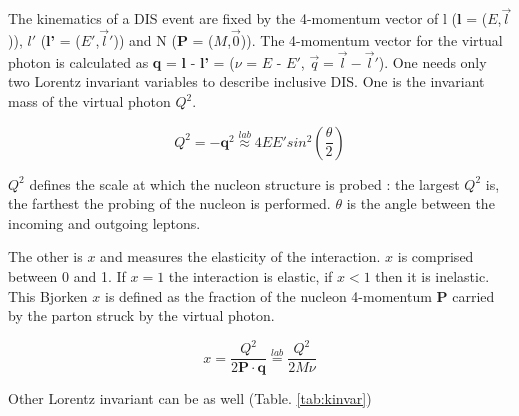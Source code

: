The kinematics of a DIS event are fixed by the 4-momentum vector of l (\textbf{l} = ($E$,$\vec{l}$)), $l'$ (\textbf{l'} = ($E'$,$\vec{l}'$))
and N (\textbf{P} = ($M$,$\vec{0}$)). The 4-momentum vector for the virtual photon is calculated as \textbf{q} = \textbf{l} - \textbf{l'} =
($\nu$ = $E$ - $E'$, $\vec{q}=\vec{l}-\vec{l}'$). One needs only two Lorentz invariant variables to describe
inclusive DIS. One is the invariant mass of the virtual photon $Q^2$.

\begin{equation}
  Q^2 = -\textbf{q}^2 \stackrel{lab}{\approx} 4EE'sin^2\left(\frac{\theta}{2}\right)
\end{equation}

$Q^2$ defines the scale at which the nucleon structure is probed : the largest $Q^2$ is, the farthest the probing
of the nucleon is performed. $\theta$ is the angle between the incoming and outgoing leptons.

The other is $x$ and measures the elasticity of the interaction. $x$ is comprised between 0 and 1. If $x=1$ the
interaction is elastic, if $x<1$ then it is inelastic. This Bjorken\cite{Bjorken} $x$ is defined as the fraction
of the nucleon 4-momentum \textbf{P} carried by the parton struck by the virtual photon.

\begin{equation}
  x = \frac{Q^2}{2\textbf{P}\cdot\textbf{q}} \stackrel{lab}{=} \frac{Q^2}{2M\nu}
\end{equation}

Other Lorentz invariant can be as well (Table. \ref{tab:kinvar})

